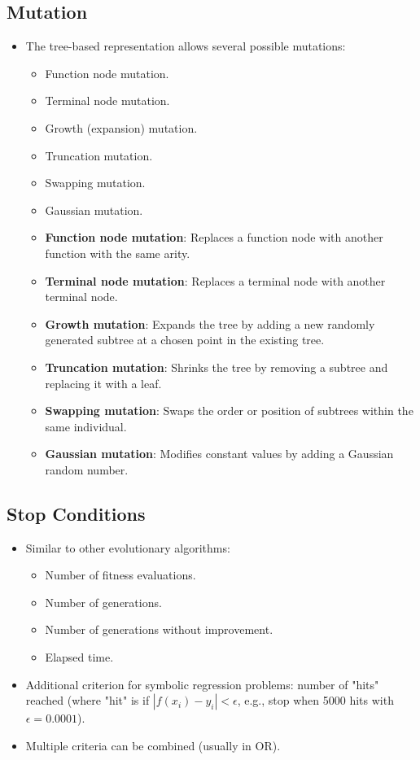 \subsection*{Mutation}
\begin{itemize}
     \item The tree-based representation allows several possible mutations:
        \begin{itemize}
            \item Function node mutation.
            \item Terminal node mutation.
            \item Growth (expansion) mutation.
             \item Truncation mutation.
            \item Swapping mutation.
            \item Gaussian mutation.
        \end{itemize}
        \begin{itemize}
            \item \textbf{Function node mutation}: Replaces a function node with another function with the same arity.
            \item \textbf{Terminal node mutation}: Replaces a terminal node with another terminal node.
           \item \textbf{Growth mutation}: Expands the tree by adding a new randomly generated subtree at a chosen point in the existing tree.
            \item \textbf{Truncation mutation}: Shrinks the tree by removing a subtree and replacing it with a leaf.
            \item \textbf{Swapping mutation}: Swaps the order or position of subtrees within the same individual.
            \item\textbf{Gaussian mutation}: Modifies constant values by adding a Gaussian random number.
        \end{itemize}
\end{itemize}

\subsection*{Stop Conditions}
\begin{itemize}
    \item  Similar to other evolutionary algorithms:
    \begin{itemize}
        \item Number of fitness evaluations.
        \item Number of generations.
        \item Number of generations without improvement.
        \item Elapsed time.
    \end{itemize}
    \item Additional criterion for symbolic regression problems: number of "hits" reached (where "hit" is if $|f(x_i) - y_i| < \epsilon$, e.g., stop when 5000 hits with $\epsilon=0.0001$).
  \item  Multiple criteria can be combined (usually in OR).
\end{itemize}

